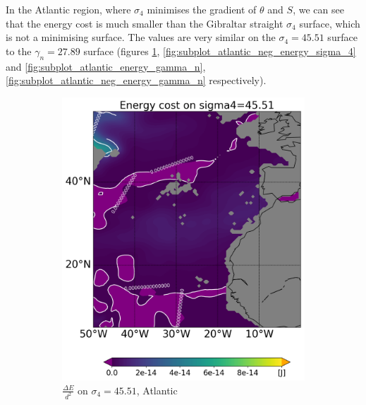 In the Atlantic region, where $\sigma_4$ minimises the gradient of $\theta$ and $S$, we can see that the energy cost is much smaller than the Gibraltar straight $\sigma_4$ surface, which is not a minimising surface. The values are very similar on the $\sigma_4 = 45.51$ surface to the $\gamma_n = 27.89$ surface (figures \ref{fig:subplot_atlantic_energy_sigma_4}, \ref{fig:subplot_atlantic_neg_energy_sigma_4} and \ref{fig:subplot_atlantic_energy_gamma_n}, \ref{fig:subplot_atlantic_neg_energy_gamma_n} respectively).

\begin{figure}[htbp]
    \centering
     \begin{subfigure}[b]{0.4\textwidth}
         
         \includegraphics[width=\textwidth]{plots/energy/atlantic_energy/Map2dcyl_energy_on_sigma4_4551e-2_reg310Eto360E05Nto57N_1990to1998av_WOCE.png}
         \caption{$\frac{\Delta E}{d^2}$ on $\sigma_4 = 45.51$, Atlantic}
         \label{fig:subplot_atlantic_energy_sigma_4}
     \end{subfigure}
     \hfill
     \begin{subfigure}[b]{0.4\textwidth}
         

\end{subfigure}
\end{figure}
